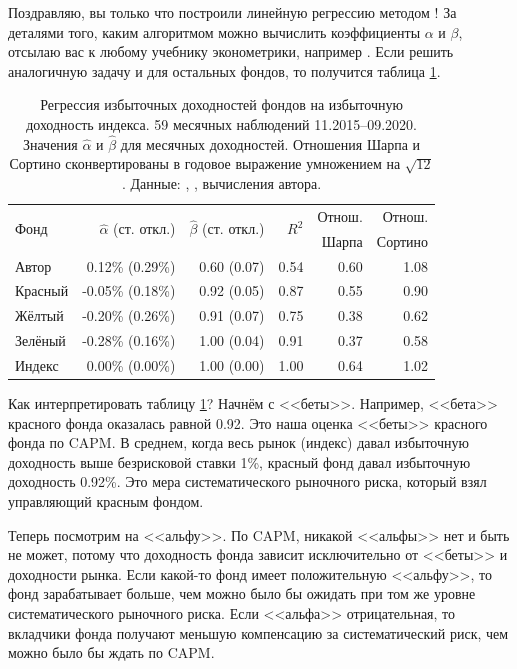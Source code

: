 Поздравляю, вы только что построили линейную регрессию методом ! За деталями того, каким алгоритмом 
можно вычислить коэффициенты $\alpha$ и $\beta$, отсылаю вас к любому учебнику 
эконометрики, например \cite[ch.~2]{verbeek2012guide}. Если решить аналогичную 
задачу и для остальных фондов, то получится таблица 
\ref{capm_regression_results}.

\begin{table}[h]
\centering
\begin{tabular}{l|r|r|r|r|r}
\multirow{2}{*}{Фонд} & 
\multirow{2}{*}{$\hat{\alpha}$ (ст. откл.)} &
\multirow{2}{*}{$\hat{\beta}$ (ст. откл.)}  &
\multirow{2}{*}{$R^2$} &
Отнош.&
Отнош. \\
& & & & Шарпа & Сортино \\ \hline
Автор   &  0.12\% (0.29\%) & 0.60 (0.07) & 0.54 & 0.60 & 1.08 \\
Красный & -0.05\% (0.18\%) & 0.92 (0.05) & 0.87 & 0.55 & 0.90 \\
Жёлтый  & -0.20\% (0.26\%) & 0.91 (0.07) & 0.75 & 0.38 & 0.62 \\
Зелёный & -0.28\% (0.16\%) & 1.00 (0.04) & 0.91 & 0.37 & 0.58 \\ \hline
Индекс  &  0.00\% (0.00\%) & 1.00 (0.00) & 1.00 & 0.64 & 1.02
\end{tabular}
\caption{Регрессия избыточных доходностей фондов на избыточную доходность 
индекса. 59 месячных наблюдений 11.2015--09.2020. Значения $\hat{\alpha}$ и 
$\hat{\beta}$ для месячных доходностей. Отношения Шарпа и Сортино 
сконвертированы в годовое выражение умножением на $\sqrt{12}$.
Данные: \cite{moex2020}, \cite{cbr2020}, вычисления автора.}
\label{capm_regression_results}
\end{table}

Как интерпретировать таблицу \ref{capm_regression_results}? Начнём с <<беты>>. 
Например, <<бета>> красного фонда оказалась равной 0.92. Это наша оценка 
<<беты>> красного фонда по CAPM. В среднем, когда весь рынок (индекс) давал 
избыточную доходность выше безрисковой ставки 1\%, красный фонд давал избыточную 
доходность 0.92\%. Это мера систематического рыночного риска, который взял 
управляющий красным фондом.

Теперь посмотрим на <<альфу>>. По CAPM, никакой <<альфы>> нет и быть не может, 
потому что доходность фонда зависит исключительно от <<беты>> и доходности 
рынка. Если какой-то фонд имеет положительную <<альфу>>, то фонд зарабатывает 
больше, чем можно было бы ожидать при том же уровне систематического рыночного 
риска. Если <<альфа>> отрицательная, то вкладчики фонда получают меньшую 
компенсацию за систематический риск, чем можно было бы ждать по CAPM.

